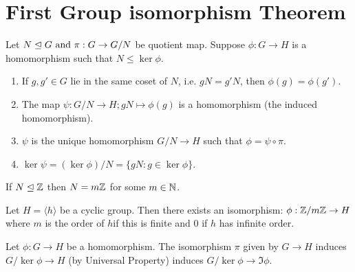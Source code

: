 \section{First Group isomorphism Theorem}

\begin{theorem}
    Let \(N \trianglelefteq G \text{ and } \pi: G \to G / N\) be quotient map. Suppose \(\phi: G \to H\) is a homomorphism such that \(N \leq \ker \phi\).
    \begin{enumerate}
        \item If \(g, g' \in G\) lie in the same coset of \(N\), i.e. \(gN = g'N\), then \(\phi(g) = \phi(g')\).
        \item The map \(\psi: G / N \to H; gN \mapsto \phi(g)\) is a homomorphism (the induced homomorphism).
        \item \(\psi\) is the unique homomorphism \(G / N \to H\) such that \(\phi = \psi \circ \pi\).
        \item \(\ker \psi = (\ker \phi) / N = \{gN : g \in \ker \phi\}\).
    \end{enumerate}
\end{theorem}

\begin{lemma}
    If \(N \trianglelefteq \mathbb{Z}\) then \(N = m\mathbb{Z}\) for some \(m \in \mathbb{N}\).
\end{lemma}

\begin{proposition}
    Let \(H = \langle h \rangle\) be a cyclic group. Then there exists an isomorphism: \(\phi: \mathbb{Z} / m\mathbb{Z} \to H\) where \(m\) is the order of \(h\)if this is finite and 0 if \(h\) has infinite order.
\end{proposition}

\begin{theorem}
    Let \(\phi: G \to H\) be a homomorphism. The isomorphism \(\pi\) given by \(G \to H\) induces \(G / \ker \phi \to H\) (by Universal Property) induces \(G / \ker \phi \to \Im \phi\).
\end{theorem}